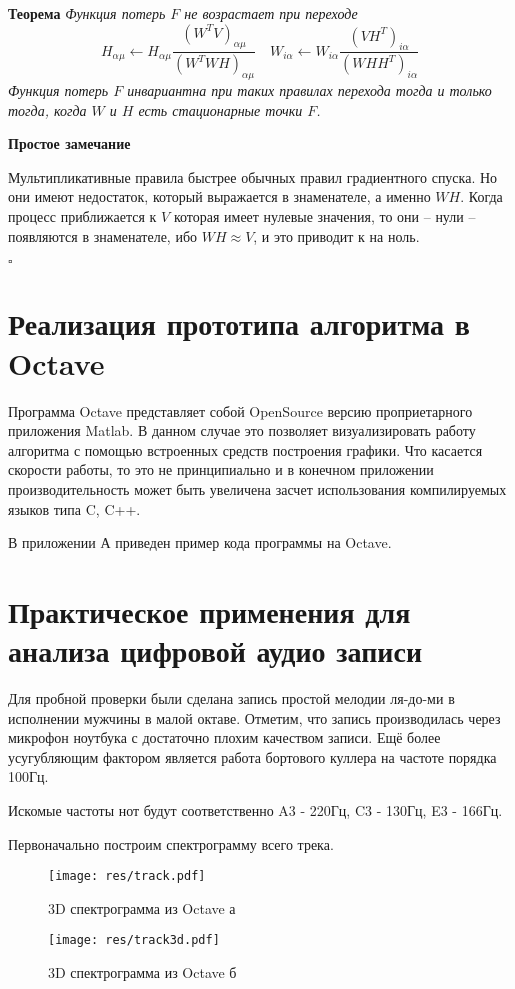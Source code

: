 \documentclass[oneside, final, 14pt]{extarticle}
\begin{document}
\textbf{Теорема} \textit{ Функция потерь $F$ не возрастает
при переходе
\[
  H_{\alpha\mu} \leftarrow H_{\alpha\mu}
  \frac{(W^TV)_{\alpha\mu}}{(W^TWH)_{\alpha\mu}} \quad
  W_{i\alpha} \leftarrow W_{i\alpha}
  \frac{(VH^T)_{i\alpha}}{(WHH^T)_{i\alpha}}
\]
Функция потерь $F$ инвариантна при таких правилах перехода тогда
и только тогда, когда $W$ и $H$ есть стационарные точки $F$.
}

\textbf{Простое замечание}

Мультипликативные правила быстрее обычных правил градиентного
спуска. Но они имеют недостаток, который выражается в знаменателе,
а именно $WH$. Когда процесс приближается к $V$ которая имеет нулевые
значения, то они -- нули -- появляются в знаменателе, ибо
$WH \approx V$, и это приводит
к { на ноль}.

$\square$


\cleardoublepage
\section{Реализация прототипа алгоритма в Octave}
  Программа Octave представляет собой OpenSource версию проприетарного приложения
  Matlab. В данном случае это позволяет визуализировать работу алгоритма с помощью
  встроенных средств построения графики. Что касается скорости работы, то это не
  принципиально и в конечном приложении производительность может быть увеличена
  засчет использования компилируемых языков типа C, C++.

  В приложении А приведен пример кода программы на Octave.

\cleardoublepage
\section{Практическое применения для анализа цифровой аудио записи}

  Для пробной проверки были сделана запись простой мелодии ля-до-ми в исполнении мужчины
  в малой октаве. Отметим, что запись производилась через микрофон ноутбука с
  достаточно плохим качеством записи. Ещё более усугубляющим фактором является
  работа бортового куллера на частоте порядка 100Гц.

  Искомые частоты нот будут соответственно A3 - 220Гц, C3 - 130Гц, E3 - 166Гц.

  Первоначально построим спектрограмму всего трека.
  \begin{figure}[h]
    \begin{multicols}{2}
      \hfill
      \texttt{[image: res/track.pdf]}
      \hfill
      \caption{3D спектрограмма из Octave а}
      \label{pic_3da}
      \hfill
      \texttt{[image: res/track3d.pdf]}
      \hfill
      \caption{3D спектрограмма из Octave б}
      \label{pic_3db}
    \end{multicols}
  \end{figure}
\end{document}
